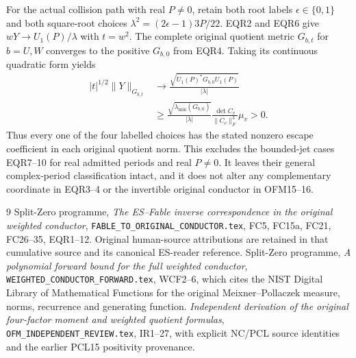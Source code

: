 \documentclass[11pt]{article}
\begin{document}
For the actual collision path with real $P\ne0$, retain both root
labels $\epsilon\in\{0,1\}$ and both square-root choices
$\lambda^2=(2\epsilon-1)3P/22$. EQR2 and EQR6 give
$wY\to U_1(P)/\lambda$ with $t=w^2$. The complete original
quotient metric $G_{b,t}$ for $b=U,W$ converges to the positive
$G_{b,0}$ from EQR4. Taking its continuous quadratic form yields
\[
 \begin{split}
 |t|^{1/2}\|Y\|_{G_{b,t}}
 &\longrightarrow\frac{\sqrt{U_1(P)^*G_{b,0}U_1(P)}}{|\lambda|}\\
 &\ge\frac{\sqrt{\lambda_{\min}(G_{b,0})}}{|\lambda|}
       \frac{\det C_v}{\|C_v\|_F^3}\mu_v>0.
 \end{split}\tag{RJR17}
\]
Thus every one of the four labelled choices has the stated nonzero
escape coefficient in each original quotient norm. This excludes
the bounded-jet cases EQR7--10 for real admitted periods and real
$P\ne0$. It leaves their general complex-period classification
intact, and it does not alter any complementary coordinate in EQR3--4
or the invertible original conductor in OFM15--16.

\begin{thebibliography}{9}
 Split-Zero programme, \emph{The ES--Fable inverse
correspondence in the original weighted conductor},
\texttt{FABLE\_TO\_ORIGINAL\_CONDUCTOR.tex}, FC5, FC15a,
FC21, FC26--35, EQR1--12. Original human-source attributions are
retained in that cumulative source and its canonical ES-reader reference.
 Split-Zero programme, \emph{A polynomial forward bound
for the full weighted conductor},
\texttt{WEIGHTED\_CONDUCTOR\_FORWARD.tex}, WCF2--6, which cites the
NIST Digital Library of Mathematical Functions for the original
Meixner--Pollaczek measure, norms, recurrence and generating function.
 \emph{Independent derivation of the original
four-factor moment and weighted quotient formulas},
\texttt{OFM\_INDEPENDENT\_REVIEW.tex}, IR1--27, with explicit
NC/PCL source identities and the earlier PCL15 positivity provenance.
\end{thebibliography}
\end{document}
